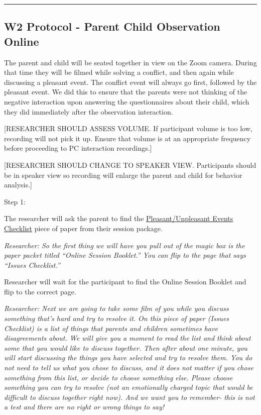 \documentclass[]{book}
\begin{document}
\begin{center}\rule{0.5\linewidth}{0.5pt}\end{center}

\hypertarget{w2-protocol---parent-child-observation-online}{%
\subsection{W2 Protocol - Parent Child Observation Online}\label{w2-protocol---parent-child-observation-online}}

The parent and child will be seated together in view on the Zoom camera. During that time they will be filmed while solving a conflict, and then again while discussing a pleasant event. The conflict event will always go first, followed by the pleasant event. We did this to ensure that the parents were not thinking of the negative interaction upon answering the questionnaires about their child, which they did immediately after the observation interaction.

{[}RESEARCHER SHOULD ASSESS VOLUME. If participant volume is too low, recording will not pick it up. Ensure that volume is at an appropriate frequency before proceeding to PC interaction recordings.{]}

{[}RESEARCHER SHOULD CHANGE TO SPEAKER VIEW. Participants should be in speaker view so recording will enlarge the parent and child for behavior analysis.{]}

Step 1:

The researcher will ask the parent to find the \href{https://ucla.app.box.com/file/630327764749}{Pleasant/Unpleasant Events Checklist} piece of paper from their session package.

\emph{Researcher: So the first thing we will have you pull out of the magic box is the paper packet titled ``Online Session Booklet.'' You can flip to the page that says ``Issues Checklist.''}

Researcher will wait for the participant to find the Online Session Booklet and flip to the correct page.

\emph{Researcher: Next we are going to take some film of you while you discuss something that's hard and try to resolve it. On this piece of paper (Issues Checklist) is a list of things that parents and children sometimes have disagreements about. We will give you a moment to read the list and think about some that you would like to discuss together. Then after about one minute, you will start discussing the things you have selected and try to resolve them. You do not need to tell us what you chose to discuss, and it does not matter if you chose something from this list, or decide to choose something else. Please choose something you can try to resolve (not an emotionally charged topic that would be difficult to discuss together right now). And we want you to remember- this is not a test and there are no right or wrong things to say!}
\end{document}
